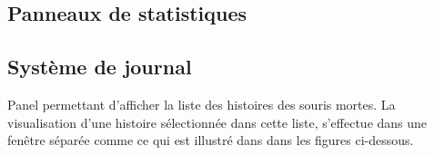 
\subsection{Panneaux de statistiques}

\clearpage
\subsection{Système de journal}

Panel permettant d'afficher la liste des histoires des souris mortes. La visualisation d'une histoire sélectionnée dans cette liste, s’effectue dans une fenêtre séparée comme ce qui est illustré dans dans les figures ci-dessous.


